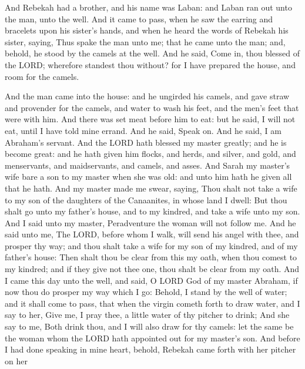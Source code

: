  And Rebekah had a brother, and his name was Laban: and
Laban ran out unto the man, unto the well.  And it came
to pass, when he saw the earring and bracelets upon his sister's hands,
and when he heard the words of Rebekah his sister, saying, Thus spake
the man unto me; that he came unto the man; and, behold, he stood by the
camels at the well.  And he said, Come in, thou blessed
of the LORD; wherefore standest thou without? for I have prepared the
house, and room for the camels.

 And the man came into the house: and he ungirded his
camels, and gave straw and provender for the camels, and water to wash
his feet, and the men's feet that were with him.  And
there was set meat before him to eat: but he said, I will not eat, until
I have told mine errand. And he said, Speak on.  And he
said, I am Abraham's servant.  And the LORD hath blessed
my master greatly; and he is become great: and he hath given him flocks,
and herds, and silver, and gold, and menservants, and maidservants, and
camels, and asses.  And Sarah my master's wife bare a son
to my master when she was old: and unto him hath he given all that he
hath.  And my master made me swear, saying, Thou shalt
not take a wife to my son of the daughters of the Canaanites, in whose
land I dwell:  But thou shalt go unto my father's house,
and to my kindred, and take a wife unto my son.  And I
said unto my master, Peradventure the woman will not follow me.
 And he said unto me, The LORD, before whom I walk, will
send his angel with thee, and prosper thy way; and thou shalt take a
wife for my son of my kindred, and of my father's house: 
Then shalt thou be clear from this my oath, when thou comest to my
kindred; and if they give not thee one, thou shalt be clear from my
oath.  And I came this day unto the well, and said, O
LORD God of my master Abraham, if now thou do prosper my way which I go:
 Behold, I stand by the well of water; and it shall come
to pass, that when the virgin cometh forth to draw water, and I say to
her, Give me, I pray thee, a little water of thy pitcher to drink;
 And she say to me, Both drink thou, and I will also draw
for thy camels: let the same be the woman whom the LORD hath appointed
out for my master's son.  And before I had done speaking
in mine heart, behold, Rebekah came forth with her pitcher on her
